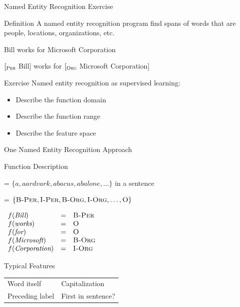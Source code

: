 \documentclass[14pt]{beamer}
\begin{document}
\begin{frame}{Named Entity Recognition Exercise}
\begin{block}{Definition}
A \alert{named entity recognition} program find spans of words that are people, locations, organizations, etc.\\
\medskip
\begin{description}[Output]
\item[Input] Bill works for Microsoft Corporation
\item[Output]
$[_{\textsc{\scriptsize Per}}$ Bill$]$ works for
$[_{\textsc{\scriptsize Org}}$ Microsoft Corporation$]$
\end{description}
\end{block}
\begin{block}{Exercise}
Named entity recognition as supervised learning:
\begin{itemize}
\item Describe the function domain
\item Describe the function range
\item Describe the feature space
\end{itemize}
\end{block}
\end{frame}

\begin{frame}{One Named Entity Recognition Approach}
\begin{block}{Function Description}
\begin{description}[$D_f$]
\item[$D_f$] = $\{\textit{a},\textit{aardvark},\textit{abacus},\textit{abalone},\ldots\}$ in a sentence
\item[$R_f$] = $\{\textsc{B-Per},\textsc{I-Per},\textsc{B-Org},\textsc{I-Org},\ldots,\textsc{O}\}$
\end{description}
\end{block}
$\begin{array}{lll}
f(\textit{Bill})        & = & \textsc{B-Per} \\
f(\textit{works})       & = & \textsc{O} \\
f(\textit{for})         & = & \textsc{O} \\
f(\textit{Microsoft})   & = & \textsc{B-Org} \\
f(\textit{Corporation}) & = & \textsc{I-Org} \\
\end{array}$
\begin{block}{Typical Features}
\begin{tabular}{p{}p{}}
Word itself     & Capitalization \\
Preceding label & First in sentence? \\
\end{tabular}
\end{block}
\end{frame}
\end{document}
